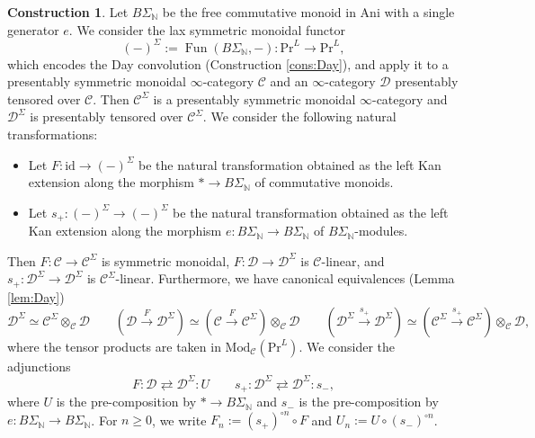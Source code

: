 \documentclass{amsart}
\theoremstyle{plain}
\theoremstyle{definition}
\newtheorem{construction}[theorem]{Construction}
\theoremstyle{remark}
\numberwithin{equation}{theorem}
\newcommand{\mcal}[1]{\mathcal{#1}}
\newcommand{\mbb}[1]{\mathbb{#1}}
\newcommand{\Ani}{\mathrm{Ani}}
\newcommand{\Mod}{\mathrm{Mod}}
\renewcommand{\Pr}{\mathrm{Pr}}
\newcommand{\id}{\mathrm{id}}
\newcommand{\Fun}{\operatorname{Fun}}
\begin{document}
\begin{construction}\label{cons:cSp}
Let $B\Sigma_\mbb{N}$ be the free commutative monoid in $\Ani$ with a single generator $e$.
We consider the lax symmetric monoidal functor
\[
	(-)^\Sigma := \Fun(B\Sigma_\mbb{N},-) \colon \Pr^L \to \Pr^L,
\]
which encodes the Day convolution (Construction \ref{cons:Day}), and apply it to a presentably symmetric monoidal $\infty$-category $\mcal{C}$ and an $\infty$-category $\mcal{D}$ presentably tensored over $\mcal{C}$.
Then $\mcal{C}^\Sigma$ is a presentably symmetric monoidal $\infty$-category and $\mcal{D}^\Sigma$ is presentably tensored over $\mcal{C}^\Sigma$.
We consider the following natural transformations:
\begin{itemize}[label={---},leftmargin=*]
\item Let $F\colon\id\to(-)^\Sigma$ be the natural transformation obtained as the left Kan extension along the morphism $*\to B\Sigma_\mbb{N}$ of commutative monoids.
\item Let $s_+\colon(-)^\Sigma\to(-)^\Sigma$ be the natural transformation obtained as the left Kan extension along the morphism $e\colon B\Sigma_\mbb{N}\to B\Sigma_\mbb{N}$ of $B\Sigma_\mbb{N}$-modules.
\end{itemize}
Then $F\colon\mcal{C}\to\mcal{C}^\Sigma$ is symmetric monoidal, $F\colon\mcal{D}\to\mcal{D}^\Sigma$ is $\mcal{C}$-linear, and $s_+\colon\mcal{D}^\Sigma\to\mcal{D}^\Sigma$ is $\mcal{C}^\Sigma$-linear.
Furthermore, we have canonical equivalences (Lemma \ref{lem:Day})
\[
	\mcal{D}^\Sigma \simeq \mcal{C}^\Sigma\otimes_\mcal{C}\mcal{D} \qquad
	(\mcal{D}\xrightarrow{F}\mcal{D}^\Sigma) \simeq (\mcal{C}\xrightarrow{F}\mcal{C}^\Sigma)\otimes_\mcal{C}\mcal{D} \qquad
	(\mcal{D}^\Sigma\xrightarrow{s_+}\mcal{D}^\Sigma) \simeq (\mcal{C}^\Sigma\xrightarrow{s_+}\mcal{C}^\Sigma)\otimes_\mcal{C}\mcal{D},
\]
where the tensor products are taken in $\Mod_\mcal{C}(\Pr^L)$.
We consider the adjunctions
\[
	F\colon\mcal{D}\rightleftarrows\mcal{D}^\Sigma\colon U \qquad
	s_+\colon\mcal{D}^\Sigma\rightleftarrows\mcal{D}^\Sigma\colon s_-,
\]
where $U$ is the pre-composition by $*\to B\Sigma_\mbb{N}$ and $s_-$ is the pre-composition by $e\colon B\Sigma_\mbb{N}\to B\Sigma_\mbb{N}$.
For $n\ge 0$, we write $F_n:=(s_+)^{\circ n}\circ F$ and $U_n:=U\circ(s_-)^{\circ n}$. 
\end{construction}
\end{document}
